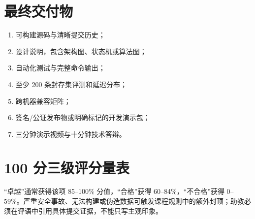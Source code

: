 \section{最终交付物}

\begin{enumerate}
  \item 可构建源码与清晰提交历史；
  \item 设计说明，包含架构图、状态机或算法图；
  \item 自动化测试与完整命令输出；
  \item 至少 200 条封存集评测和延迟分布；
  \item 跨机器兼容矩阵；
  \item 签名/公证发布物或明确标记的开发演示包；
  \item 三分钟演示视频与十分钟技术答辩。
\end{enumerate}

\section{100 分三级评分量表}

“卓越”通常获得该项 85--100\% 分值，“合格”获得 60--84\%，“不合格”获得 0--59\%。严重安全事故、无法构建或伪造数据可触发课程规则中的额外封顶；助教必须在评语中引用具体提交证据，不能只写主观印象。


